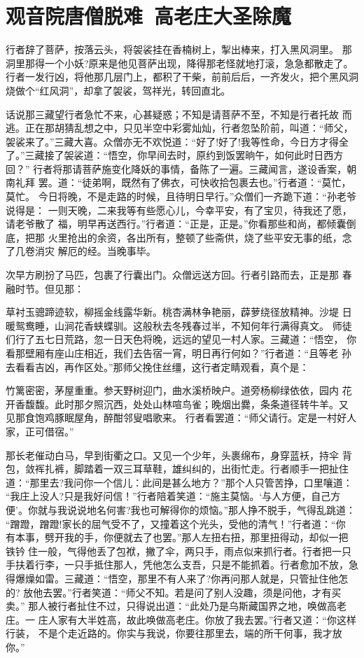 \chapter{观音院唐僧脱难~高老庄大圣除魔}

行者辞了菩萨，按落云头，将袈裟挂在香楠树上，掣出棒来，打入黑风洞里。
那洞里那得一个小妖?原来是他见菩萨出现，降得那老怪就地打滚，急急都散走了。
行者一发行凶，将他那几层门上，都积了干柴，前前后后，一齐发火，把个黑风洞
烧做个“红风洞”，却拿了袈裟，驾祥光，转回直北。

话说那三藏望行者急忙不来，心甚疑惑；不知是请菩萨不至，不知是行者托故
而逃。正在那胡猜乱想之中，只见半空中彩雾灿灿，行者忽坠阶前，叫道：“师父，
袈裟来了。”三藏大喜。众僧亦无不欢悦道：“好了!好了!我等性命，今日方才得全
了。”三藏接了袈裟道：“悟空，你早间去时，原约到饭罢晌午，如何此时日西方回？”
行者将那请菩萨施变化降妖的事情，备陈了一遍。三藏闻言，遂设香案，朝南礼拜
罢。道：“徒弟啊，既然有了佛衣，可快收拾包裹去也。”行者道：“莫忙，莫忙。
今日将晚，不是走路的时候，且待明日早行。”众僧们一齐跪下道：“孙老爷说得是：
一则天晚，二来我等有些愿心儿，今幸平安，有了宝贝，待我还了愿，请老爷散了
福，明早再送西行。”行者道：“正是，正是。”你看那些和尚，都倾囊倒底，把那
火里抢出的余资，各出所有，整顿了些斋供，烧了些平安无事的纸，念了几卷消灾
解厄的经。当晚事毕。

次早方刷扮了马匹，包裹了行囊出门。众僧远送方回。行者引路而去，正是那
春融时节。但见那：

草衬玉骢蹄迹软，柳摇金线露华新。桃杏满林争艳丽，薜萝绕径放精神。沙堤
日暖鸳鸯睡，山涧花香蛱蝶驯。这般秋去冬残春过半，不知何年行满得真文。
师徒们行了五七日荒路，忽一日天色将晚，远远的望见一村人家。三藏道：“悟空，
你看那壁厢有座山庄相近，我们去告宿一宵，明日再行何如？”行者道：“且等老
孙去看看吉凶，再作区处。”那师父挽住丝缰，这行者定睛观看，真个是：

竹篱密密，茅屋重重。参天野树迎门，曲水溪桥映户。道旁杨柳绿依依，园内
花开香馥馥。此时那夕照沉西，处处山林喧鸟雀；晚烟出爨，条条道径转牛羊。又
见那食饱鸡豚眠屋角，醉酣邻叟唱歌来。
行者看罢道：“师父请行。定是一村好人家，正可借宿。”

那长老催动白马，早到街衢之口。又见一个少年，头裹绵布，身穿蓝袄，持伞
背包，敛裈扎裤，脚踏着一双三耳草鞋，雄纠纠的，出街忙走。行者顺手一把扯住
道：“那里去?我问你一个信儿：此间是甚么地方？”那个人只管苦挣，口里嚷道：
“我庄上没人?只是我好问信！”行者陪着笑道：“施主莫恼。‘与人方便，自己方
便’。你就与我说说地名何害?我也可解得你的烦恼。”那人挣不脱手，气得乱跳道：
“蹭蹬，蹭蹬!家长的屈气受不了，又撞着这个光头，受他的清气！”行者道：“你
有本事，劈开我的手，你便就去了也罢。”那人左扭右扭，那里扭得动，却似一把
铁钤住一般，气得他丢了包袱，撇了伞，两只手，雨点似来抓行者。行者把一只
手扶着行李，一只手抵住那人，凭他怎么支吾，只是不能抓着。行者愈加不放，急
得爆燥如雷。三藏道：“悟空，那里不有人来了?你再问那人就是，只管扯住他怎的?
放他去罢。”行者笑道：“师父不知。若是问了别人没趣，须是问他，才有买卖。”
那人被行者扯住不过，只得说出道：“此处乃是乌斯藏国界之地，唤做高老庄。一
庄人家有大半姓高，故此唤做高老庄。你放了我去罢。”行者又道：“你这样行装，
不是个走近路的。你实与我说，你要往那里去，端的所干何事，我才放你。”

